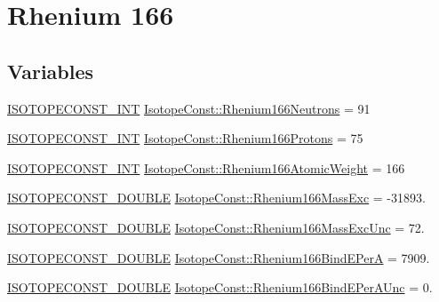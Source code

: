 \hypertarget{group___isotope_const-_rhenium-_re166}{}\section{Rhenium 166}
\label{group___isotope_const-_rhenium-_re166}
\subsection*{Variables}
\begin{DoxyCompactItemize}
\item 
\mbox{\hyperlink{group___isotope_const-_macros_ga5f18360b3e99483a35c32d789e62621c}{I\+S\+O\+T\+O\+P\+E\+C\+O\+N\+S\+T\+\_\+\+I\+NT}} \mbox{\hyperlink{group___isotope_const-_rhenium-_re166_ga263e14aa7a395fdb9a0306ca141ee40f}{Isotope\+Const\+::\+Rhenium166\+Neutrons}} = 91
\item 
\mbox{\hyperlink{group___isotope_const-_macros_ga5f18360b3e99483a35c32d789e62621c}{I\+S\+O\+T\+O\+P\+E\+C\+O\+N\+S\+T\+\_\+\+I\+NT}} \mbox{\hyperlink{group___isotope_const-_rhenium-_re166_ga986095c9b8cf8b6aa8f58787b977baef}{Isotope\+Const\+::\+Rhenium166\+Protons}} = 75
\item 
\mbox{\hyperlink{group___isotope_const-_macros_ga5f18360b3e99483a35c32d789e62621c}{I\+S\+O\+T\+O\+P\+E\+C\+O\+N\+S\+T\+\_\+\+I\+NT}} \mbox{\hyperlink{group___isotope_const-_rhenium-_re166_ga0fdf54980b6504f7246336a980cd545a}{Isotope\+Const\+::\+Rhenium166\+Atomic\+Weight}} = 166
\item 
\mbox{\hyperlink{group___isotope_const-_macros_ga8f45a7272ce02c0b4c65c44636ed719a}{I\+S\+O\+T\+O\+P\+E\+C\+O\+N\+S\+T\+\_\+\+D\+O\+U\+B\+LE}} \mbox{\hyperlink{group___isotope_const-_rhenium-_re166_ga2cccf1b56a20f0f23be2f87fcc483158}{Isotope\+Const\+::\+Rhenium166\+Mass\+Exc}} = -\/31893.
\item 
\mbox{\hyperlink{group___isotope_const-_macros_ga8f45a7272ce02c0b4c65c44636ed719a}{I\+S\+O\+T\+O\+P\+E\+C\+O\+N\+S\+T\+\_\+\+D\+O\+U\+B\+LE}} \mbox{\hyperlink{group___isotope_const-_rhenium-_re166_ga00f8061934ac4639b6a5b4bd14cb617a}{Isotope\+Const\+::\+Rhenium166\+Mass\+Exc\+Unc}} = 72.
\item 
\mbox{\hyperlink{group___isotope_const-_macros_ga8f45a7272ce02c0b4c65c44636ed719a}{I\+S\+O\+T\+O\+P\+E\+C\+O\+N\+S\+T\+\_\+\+D\+O\+U\+B\+LE}} \mbox{\hyperlink{group___isotope_const-_rhenium-_re166_ga0fa89ab1ff58c7c545cb485dfd47933a}{Isotope\+Const\+::\+Rhenium166\+Bind\+E\+PerA}} = 7909.
\item 
\mbox{\hyperlink{group___isotope_const-_macros_ga8f45a7272ce02c0b4c65c44636ed719a}{I\+S\+O\+T\+O\+P\+E\+C\+O\+N\+S\+T\+\_\+\+D\+O\+U\+B\+LE}} \mbox{\hyperlink{group___isotope_const-_rhenium-_re166_ga66c5407f6cfa0ee6d489f3fa2055e043}{Isotope\+Const\+::\+Rhenium166\+Bind\+E\+Per\+A\+Unc}} = 0.

\end{DoxyCompactItemize}
